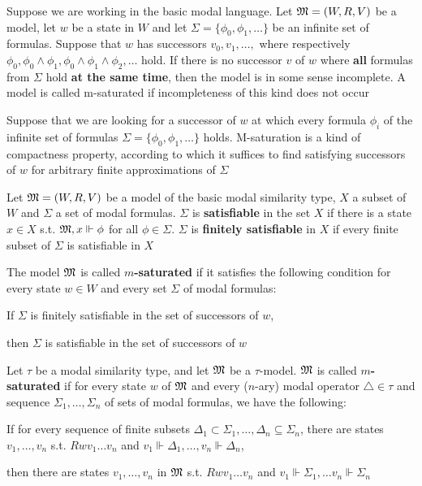 \documentclass[11pt]{article}
\begin{document}
Suppose we are working in the basic modal language. Let \(\mathfrak{M}=(W,R,V)\) be a
model, let \(w\) be a state in \(W\) and let
\(\Sigma=\{\phi_0,\phi_1,\dots\}\) be an infinite set of formulas. Suppose
that \(w\) has successors \(v_0,v_1,\dots,\) where respectively
\(\phi_0,\phi_0\wedge\phi_1,\phi_0\wedge\phi_1\wedge\phi_2,\dots\) hold. If
there is no successor \(v\) of \(w\) where \textbf{all} formulas from \(\Sigma\) hold \textbf{at the
same time}, then the model is in some sense incomplete. A model is called
m-saturated if incompleteness of this kind does not occur

Suppose that we are looking for a successor of \(w\) at which every formula
\(\phi_i\) of the infinite set of formulas
\(\Sigma=\{\phi_0,\phi_1,\dots\}\) holds. M-saturation is a kind of
compactness property, according to which it suffices to find satisfying
successors of \(w\) for arbitrary finite approximations of \(\Sigma\)

\begin{definition}[M-saturation]
Let \(\mathfrak{M}=(W,R,V)\) be a model of the basic modal similarity type, \(X\) a
subset of \(W\) and \(\Sigma\) a set of modal formulas. \(\Sigma\) is \textbf{satisfiable} in the set
\(X\) if there is a state \(x\in X\) s.t. \(\mathfrak{M},x\Vdash\phi\) for all
\(\phi\in\Sigma\). \(\Sigma\) is \textbf{finitely satisfiable} in \(X\) if every finite subset
of \(\Sigma\) is satisfiable in \(X\)

The model \(\mathfrak{M}\) is called \textbf{\(m\)-saturated} if it satisfies the following
condition for every state \(w\in W\) and every set \(\Sigma\) of modal formulas:

\begin{center}
If \(\Sigma\) is finitely satisfiable in the set of successors of \(w\), \par
then
\(\Sigma\) is satisfiable in the set of successors of \(w\)
\end{center}

Let \(\tau\) be a modal similarity type, and let \(\mathfrak{M}\) be a \(\tau\)-model.
\(\mathfrak{M}\) is called \textbf{\(m\)-saturated} if for every state \(w\) of \(\mathfrak{M}\) and
every (\(n\)-ary) modal operator \(\triangle\in\tau\) and sequence
\(\Sigma_1,\dots,\Sigma_n\) of sets of modal formulas, we have the
following:

\begin{center}
    If for every sequence of finite subsets \(\Delta_1\subset\Sigma_1,\dots,\Delta_n
    \subseteq\Sigma_n\), there are states \(v_1,\dots,v_n\) s.t.
    \(Rwv_1\dots v_n\) and \(v_1\Vdash\Delta_1,\dots,v_n\Vdash\Delta_n\),\par
    then there are states \(v_1,\dots,v_n\) in \(\mathfrak{M}\) s.t. \(Rwv_1\dots v_n\) and
    \(v_1\Vdash\Sigma_1,\dots v_n\Vdash\Sigma_n\)
\end{center}
\end{definition}
\end{document}
